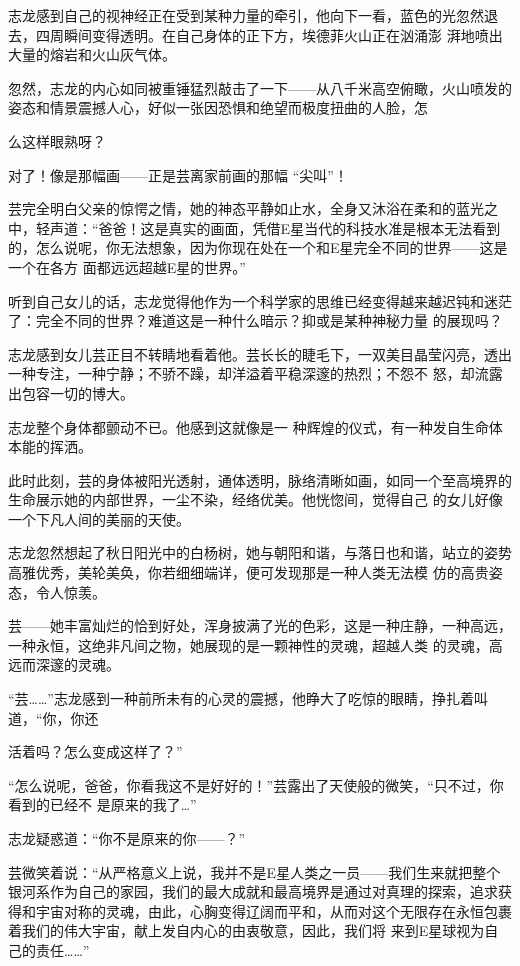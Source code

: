 \documentclass{article}
\begin{document}
志龙感到自己的视神经正在受到某种力量的牵引，他向下一看，蓝色的光忽然退去，四周瞬间变得透明。在自己身体的正下方，埃德菲火山正在汹涌澎
湃地喷出大量的熔岩和火山灰气体。 

忽然，志龙的内心如同被重锤猛烈敲击了一下——从八千米高空俯瞰，火山喷发的姿态和情景震撼人心，好似一张因恐惧和绝望而极度扭曲的人脸，怎

\newpage
么这样眼熟呀？ 

对了！像是那幅画——正是芸离家前画的那幅
“尖叫”！ 

芸完全明白父亲的惊愕之情，她的神态平静如止水，全身又沐浴在柔和的蓝光之中，轻声道：“爸爸！这是真实的画面，凭借E星当代的科技水准是根本无法看到的，怎么说呢，你无法想象，因为你现在处在一个和E星完全不同的世界——这是一个在各方
面都远远超越E星的世界。” 

听到自己女儿的话，志龙觉得他作为一个科学家的思维已经变得越来越迟钝和迷茫了：完全不同的世界？难道这是一种什么暗示？抑或是某种神秘力量
的展现吗？ 

志龙感到女儿芸正目不转睛地看着他。芸长长的睫毛下，一双美目晶莹闪亮，透出一种专注，一种宁静；不骄不躁，却洋溢着平稳深邃的热烈；不怨不
怒，却流露出包容一切的博大。 

\newpage

志龙整个身体都颤动不已。他感到这就像是一
种辉煌的仪式，有一种发自生命体本能的挥洒。 

此时此刻，芸的身体被阳光透射，通体透明，脉络清晰如画，如同一个至高境界的生命展示她的内部世界，一尘不染，经络优美。他恍惚间，觉得自己
的女儿好像一个下凡人间的美丽的天使。 

志龙忽然想起了秋日阳光中的白杨树，她与朝阳和谐，与落日也和谐，站立的姿势高雅优秀，美轮美奂，你若细细端详，便可发现那是一种人类无法模
仿的高贵姿态，令人惊羡。 

芸——她丰富灿烂的恰到好处，浑身披满了光的色彩，这是一种庄静，一种高远，一种永恒，这绝非凡间之物，她展现的是一颗神性的灵魂，超越人类
的灵魂，高远而深邃的灵魂。 

“芸……”志龙感到一种前所未有的心灵的震撼，他睁大了吃惊的眼睛，挣扎着叫道，“你，你还

\newpage
活着吗？怎么变成这样了？” 

“怎么说呢，爸爸，你看我这不是好好的！”芸露出了天使般的微笑，“只不过，你看到的已经不
是原来的我了…” 


志龙疑惑道：“你不是原来的你——？” 

芸微笑着说：“从严格意义上说，我并不是E星人类之一员——我们生来就把整个银河系作为自己的家园，我们的最大成就和最高境界是通过对真理的探索，追求获得和宇宙对称的灵魂，由此，心胸变得辽阔而平和，从而对这个无限存在永恒包裹着我们的伟大宇宙，献上发自内心的由衷敬意，因此，我们将
来到E星球视为自己的责任……” 
\end{document}
